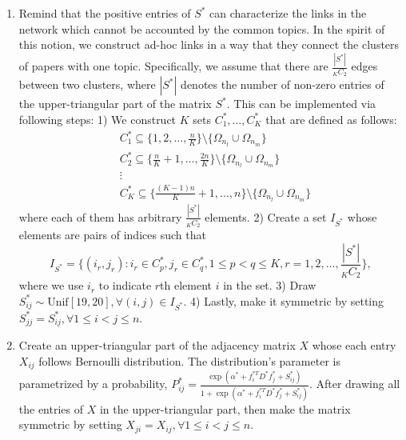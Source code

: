 \documentclass[AMS,STIX1COL]{WileyNJD-v2}
\begin{document}
{\begin{enumerate}
    \item Remind that the positive entries of $S^*$ can characterize the links in the network which cannot be accounted by the common topics.
        In the spirit of this notion, we construct ad-hoc links in a way that they connect the clusters of papers with one topic.
        Specifically, we assume that there are $\frac{|S^*|}{_KC_{2}}$ edges between two clusters, where $|S^*|$ denotes the number of non-zero entries of the upper-triangular part of the matrix $S^*$.
        This can be implemented via following steps:
        1) We construct $K$ sets $C^*_1,\dots,C^*_K$ that are defined as follows:
        \begin{align*}
           &C^*_{1} \subseteq \big\{1, 2, \dots, \frac{n}{K} \big\} \setminus \big\{ \Omega_{n_l}
           \cup \Omega_{n_m} \big\} \\
           &C^*_{2} \subseteq \big\{\frac{n}{K}+1, \dots, \frac{2n}{K} \big\} \setminus \big\{ \Omega_{n_l} \cup \Omega_{n_m} \big\}  \\
           &\vdots \\
           &C^*_{K} \subseteq \big\{\frac{(K-1)n}{K}+1, \dots, n \big\} \setminus \big\{ \Omega_{n_l}
           \cup \Omega_{n_m} \big\}
        \end{align*}
        where each of them has arbitrary $\frac{|S^*|}{_KC_{2}}$ elements.
        2) Create a set $I_{S^*}$ whose elements are pairs of indices such that
        \[
            I_{S^*} =
            \bigg\{ (i_r,j_r) : i_r \in C^*_p, j_r \in C^*_q, 1 \leq p < q \leq K,   r = 1,2,\dots,\frac{|S^*|}{_KC_{2}} \bigg\},
        \]
        where we use $i_r$ to indicate $r$th element $i$ in the set.
        3) Draw $S^*_{ij} \sim \mbox{Unif}[19,20], \forall (i,j) \in I_{S^*}$.
        4) Lastly, make it symmetric by setting $S^*_{jj}=S^*_{ij},\forall 1\leq i < j \leq n$.
    \item Create an upper-triangular part of the adjacency matrix $X$ whose each entry $X_{ij}$ follows Bernoulli distribution.
        The distribution's parameter is parametrized by a probability, $P^{*}_{ij}=\frac{\exp (\alpha^{*}+f^{*T}_{i}D^{*}f^{*}_{j} +  S^{*}_{ij})}{1+\exp(\alpha^{*}+f^{*T}_{i}D^{*}f^{*}_{j} +  S^{*}_{ij})}$.
        After drawing all the entries of $X$ in the upper-triangular part, then make the matrix symmetric by setting $X_{ji}=X_{ij},\forall 1 \leq i < j \leq n$.
\end{enumerate}


}
\end{document}
